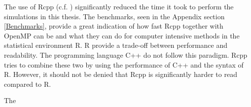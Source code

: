 The use of Rcpp (c.f. \citet{Rcpp}) significantly reduced the time it took to perform the simulations in this thesis. The benchmarks, seen in the Appendix section \ref{Benchmarks}, provide a great indication of how fast Rcpp together with OpenMP can be and what they can do for computer intensive methods in the statistical environment \textsf{R}. \textsf{R} provide a trade-off between performance and readability. The programming language C++ do not follow this paradigm. Rcpp tries to combine these two by using the performance of C++ and the syntax of \textsf{R}. However, it should not be denied that Rcpp is significantly harder to read compared to \textsf{R}.

The 

